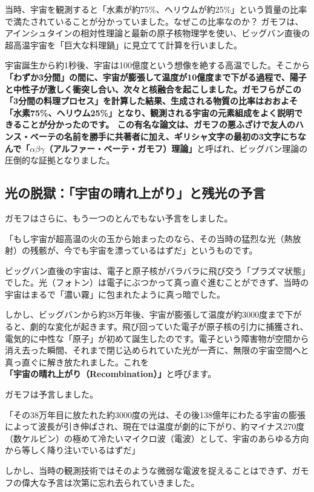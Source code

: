 当時、宇宙を観測すると「水素が約75\%、ヘリウムが約25\%」という質量の比率で満たされていることが分かっていました。なぜこの比率なのか？ ガモフは、アインシュタインの相対性理論と最新の原子核物理学を使い、ビッグバン直後の超高温宇宙を「巨大な料理鍋」に見立てて計算を行いました。

宇宙誕生から約1秒後、宇宙は100億度という想像を絶する高温でした。そこから\textbf{「わずか3分間」の間に、宇宙が膨張して温度が10億度まで下がる過程で、陽子と中性子が激しく衝突し合い、次々と核融合を起こしました。ガモフらがこの「3分間の料理プロセス」を計算した結果、生成される物質の比率はおおよそ「水素75\%、ヘリウム25\%」となり、観測される宇宙の元素組成をよく説明できることが分かったのです。 この有名な論文は、ガモフの悪ふざけで友人のハンス・ベーテの名前を勝手に共著者に加え、ギリシャ文字の最初の3文字にちなんで「\(\alpha\beta\gamma\)（アルファー・ベーテ・ガモフ）理論」}と呼ばれ、ビッグバン理論の圧倒的な証拠となりました。

\subsection{光の脱獄：「宇宙の晴れ上がり」と残光の予言}

ガモフはさらに、もう一つのとんでもない予言をしました。

「もし宇宙が超高温の火の玉から始まったのなら、その当時の猛烈な光（熱放射）の残骸が、今でも宇宙を漂っているはずだ」というものです。

ビッグバン直後の宇宙は、電子と原子核がバラバラに飛び交う「プラズマ状態」でした。光（フォトン）は電子にぶつかって真っ直ぐ進むことができず、当時の宇宙はまるで「濃い霧」に包まれたように真っ暗でした。

しかし、ビッグバンから約38万年後、宇宙が膨張して温度が約3000度まで下がると、劇的な変化が起きます。飛び回っていた電子が原子核の引力に捕獲され、電気的に中性な「原子」が初めて誕生したのです。電子という障害物が空間から消え去った瞬間、それまで閉じ込められていた光が一斉に、無限の宇宙空間へと真っ直ぐに解き放たれました。これを\textbf{「宇宙の晴れ上がり（Recombination）」}と呼びます。

ガモフは予言しました。

「その38万年目に放たれた約3000度の光は、その後138億年にわたる宇宙の膨張によって波長が引き伸ばされ、現在では温度が劇的に下がり、約マイナス270度（数ケルビン）の極めて冷たいマイクロ波（電波）として、宇宙のあらゆる方向から等しく降り注いでいるはずだ」

しかし、当時の観測技術ではそのような微弱な電波を捉えることはできず、ガモフの偉大な予言は次第に忘れ去られていきました。

